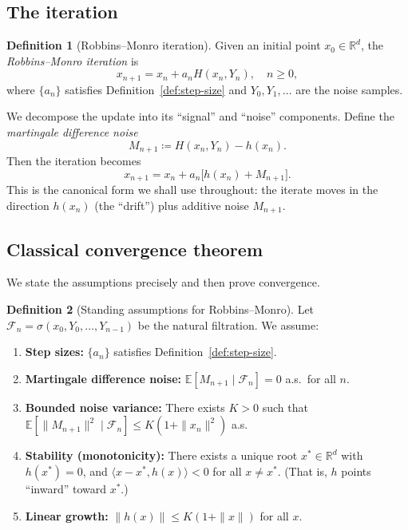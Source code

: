 \documentclass[11pt,a4paper]{article}
\theoremstyle{definition}
\newtheorem{definition}{Definition}[section]
\theoremstyle{plain}
\theoremstyle{remark}
\newcommand{\R}{\mathbb{R}}
\newcommand{\E}{\mathbb{E}}
\begin{document}
\subsection{The iteration}

\begin{definition}[Robbins--Monro iteration]
\label{def:rm-iteration}
Given an initial point $x_0 \in \R^d$, the \emph{Robbins--Monro iteration} is
\begin{equation}
\label{eq:rm}
  x_{n+1} = x_n + a_n H(x_n, Y_n), \quad n \geq 0,
\end{equation}
where $\{a_n\}$ satisfies Definition~\ref{def:step-size} and $Y_0, Y_1, \ldots$ are
the noise samples.
\end{definition}

We decompose the update into its ``signal'' and ``noise'' components. Define the
\emph{martingale difference noise}
\begin{equation}
\label{eq:mds-noise}
  M_{n+1} \coloneqq H(x_n, Y_n) - h(x_n).
\end{equation}
Then the iteration becomes
\begin{equation}
\label{eq:rm-decomposed}
  x_{n+1} = x_n + a_n\bigl[h(x_n) + M_{n+1}\bigr].
\end{equation}
This is the canonical form we shall use throughout: the iterate moves in the direction
$h(x_n)$ (the ``drift'') plus additive noise $M_{n+1}$.

\subsection{Classical convergence theorem}

We state the assumptions precisely and then prove convergence.

\begin{definition}[Standing assumptions for Robbins--Monro]
\label{def:rm-assumptions}
Let $\mathcal{F}_n = \sigma(x_0, Y_0, \ldots, Y_{n-1})$ be the natural filtration.
We assume:
\begin{enumerate}[label=(A\arabic*)]
\item \label{A1} \textbf{Step sizes:} $\{a_n\}$ satisfies Definition~\ref{def:step-size}.
\item \label{A2} \textbf{Martingale difference noise:} $\E[M_{n+1} \mid \mathcal{F}_n] = 0$ a.s.\ for all $n$.
\item \label{A3} \textbf{Bounded noise variance:} There exists $K > 0$ such that
  $\E[\|M_{n+1}\|^2 \mid \mathcal{F}_n] \leq K(1 + \|x_n\|^2)$ a.s.
\item \label{A4} \textbf{Stability (monotonicity):} There exists a unique root
  $x^* \in \R^d$ with $h(x^*) = 0$, and $\langle x - x^*, h(x) \rangle < 0$ for
  all $x \neq x^*$. (That is, $h$ points ``inward'' toward $x^*$.)
\item \label{A5} \textbf{Linear growth:} $\|h(x)\| \leq K(1 + \|x\|)$ for all $x$.
\end{enumerate}
\end{definition}
\end{document}
